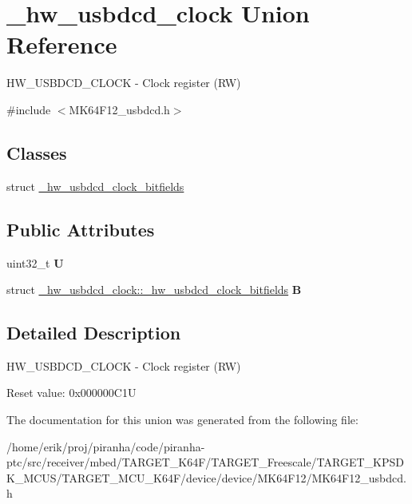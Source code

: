 \hypertarget{union__hw__usbdcd__clock}{}\section{\+\_\+hw\+\_\+usbdcd\+\_\+clock Union Reference}
\label{union__hw__usbdcd__clock}


H\+W\+\_\+\+U\+S\+B\+D\+C\+D\+\_\+\+C\+L\+O\+CK -\/ Clock register (RW)  




{\ttfamily \#include $<$M\+K64\+F12\+\_\+usbdcd.\+h$>$}

\subsection*{Classes}
\begin{DoxyCompactItemize}
\item 
struct \hyperlink{struct__hw__usbdcd__clock_1_1__hw__usbdcd__clock__bitfields}{\+\_\+hw\+\_\+usbdcd\+\_\+clock\+\_\+bitfields}
\end{DoxyCompactItemize}
\subsection*{Public Attributes}
\begin{DoxyCompactItemize}
\item 
uint32\+\_\+t {\bfseries U}\hypertarget{union__hw__usbdcd__clock_aa8f1dd72c8a0af1d043e413867bec2dd}{}\label{union__hw__usbdcd__clock_aa8f1dd72c8a0af1d043e413867bec2dd}

\item 
struct \hyperlink{struct__hw__usbdcd__clock_1_1__hw__usbdcd__clock__bitfields}{\+\_\+hw\+\_\+usbdcd\+\_\+clock\+::\+\_\+hw\+\_\+usbdcd\+\_\+clock\+\_\+bitfields} {\bfseries B}\hypertarget{union__hw__usbdcd__clock_af26e66c27595f48f94e194b9025fb303}{}\label{union__hw__usbdcd__clock_af26e66c27595f48f94e194b9025fb303}

\end{DoxyCompactItemize}


\subsection{Detailed Description}
H\+W\+\_\+\+U\+S\+B\+D\+C\+D\+\_\+\+C\+L\+O\+CK -\/ Clock register (RW) 

Reset value\+: 0x000000\+C1U 

The documentation for this union was generated from the following file\+:\begin{DoxyCompactItemize}
\item 
/home/erik/proj/piranha/code/piranha-\/ptc/src/receiver/mbed/\+T\+A\+R\+G\+E\+T\+\_\+\+K64\+F/\+T\+A\+R\+G\+E\+T\+\_\+\+Freescale/\+T\+A\+R\+G\+E\+T\+\_\+\+K\+P\+S\+D\+K\+\_\+\+M\+C\+U\+S/\+T\+A\+R\+G\+E\+T\+\_\+\+M\+C\+U\+\_\+\+K64\+F/device/device/\+M\+K64\+F12/M\+K64\+F12\+\_\+usbdcd.\+h\end{DoxyCompactItemize}
